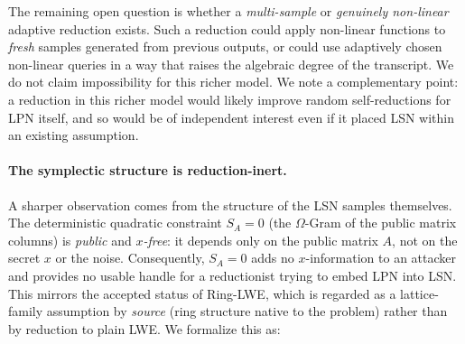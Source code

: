 \documentclass[11pt,a4paper]{article}
\theoremstyle{plain}
\theoremstyle{definition}
\begin{document}
The remaining open question is whether a \emph{multi-sample} or \emph{genuinely non-linear} adaptive reduction exists. Such a reduction could apply non-linear functions to \emph{fresh} samples generated from previous outputs, or could use adaptively chosen non-linear queries in a way that raises the algebraic degree of the transcript. We do not claim impossibility for this richer model. We note a complementary point: a reduction in this richer model would likely improve random self-reductions for LPN itself, and so would be of independent interest even if it placed LSN within an existing assumption.

\paragraph{The symplectic structure is reduction-inert.}
A sharper observation comes from the structure of the LSN samples themselves. The deterministic quadratic constraint $S_A = 0$ (the $\Omega$-Gram of the public matrix columns) is \emph{public} and \emph{$x$-free}: it depends only on the public matrix $A$, not on the secret $x$ or the noise. Consequently, $S_A=0$ adds no $x$-information to an attacker and provides no usable handle for a reductionist trying to embed LPN into LSN. This mirrors the accepted status of Ring-LWE, which is regarded as a lattice-family assumption by \emph{source} (ring structure native to the problem) rather than by reduction to plain LWE. We formalize this as:
\end{document}

